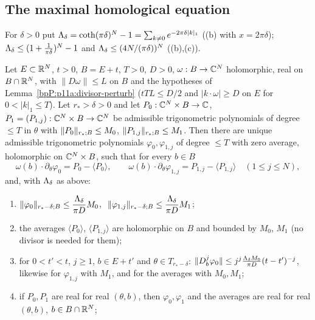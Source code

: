 \subsection{The maximal homological equation}\label{bpP:p11a:sec-hom}

For $\delta>0$ put $\Lambda_{\delta}=\coth(\pi\delta)^N-1=\sum_{k\ne0}e^{-2\pi\delta\lvert k\rvert_1}$ ((b) with $x=2\pi\delta$); $\Lambda_{\delta}\le(1+\frac1{\pi\delta})^N-1$ and $\Lambda_{\delta}\le(4N/(\pi\delta))^N$ ((b),(c)).

\begin{proposition}\label{bpP:p11a:homological-maximal}
Let $E\subset\mathbb{R}^N$, $t>0$, $B=E+t$, $T>0$, $D>0$, $\omega:B\to\mathbb{C}^N$ holomorphic, real on $B\cap\mathbb{R}^N$, with $\lVert D\omega\rVert\le L$ on $B$ and the hypotheses of Lemma~\ref{bpP:p11a:divisor-perturb} ($tTL\le D/2$ and $\lvert k\cdot\omega\rvert\ge D$ on $E$ for $0<\lvert k\rvert_1\le T$). Let $r_*>\delta>0$ and let $P_0:\mathbb{C}^N\times B\to\mathbb{C}$, $P_1=(P_{1,j}):\mathbb{C}^N\times B\to\mathbb{C}^N$ be admissible trigonometric polynomials of degree $\le T$ in $\theta$ with $\lVert P_0\rVert_{r_*;B}\le M_0$, $\lVert P_{1,j}\rVert_{r_*;B}\le M_1$. Then there are unique admissible trigonometric polynomials $\varphi_0,\varphi_{1,j}$ of degree $\le T$ with zero average, holomorphic on $\mathbb{C}^N\times B$, such that for every $b\in B$
\[\omega(b)\cdot\partial_\theta\varphi_0=P_0-\langle P_0\rangle,\qquad \omega(b)\cdot\partial_\theta\varphi_{1,j}=P_{1,j}-\langle P_{1,j}\rangle\quad(1\le j\le N),\]
and, with $\Lambda_{\delta}$ as above:
\begin{enumerate}[label=(\alph*)]
\item $\lVert \varphi_0\rVert_{r_*-\delta;B}\le\dfrac{\Lambda_{\delta}}{\pi D}M_0$, $\ \nrm{\varphi_{1,j}}{r_*-\delta;B}\le\dfrac{\Lam\delta}{\pi D}M_1$;
\item the averages $\langle P_0\rangle$, $\langle P_{1,j}\rangle$ are holomorphic on $B$ and bounded by $M_0$, $M_1$ (no divisor is needed for them);
\item for $0<t'<t$, $j\ge1$, $b\in E+t'$ and $\theta\in T_{r_*-\delta}$: $\lVert D_b^j\varphi_0\rVert\le j^j\frac{\Lambda_{\delta} M_0}{\pi D}(t-t')^{-j}$, likewise for $\varphi_{1,j}$ with $M_1$, and for the averages with $M_0,M_1$;
\item if $P_0,P_1$ are real for real $(\theta,b)$, then $\varphi_0,\varphi_1$ and the averages are real for real $(\theta,b)$, $b\in B\cap\mathbb{R}^N$;

\end{enumerate}
\end{proposition}
